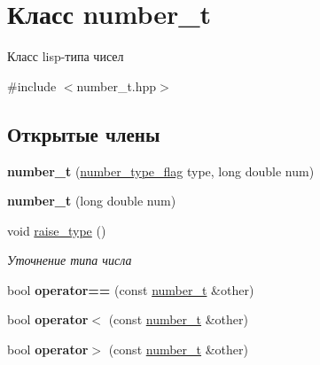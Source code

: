 \hypertarget{classnumber__t}{}\section{Класс number\+\_\+t}
\label{classnumber__t}


Класс lisp-\/типа чисел  




{\ttfamily \#include $<$number\+\_\+t.\+hpp$>$}

\subsection*{Открытые члены}
\begin{DoxyCompactItemize}
\item 
\mbox{\label{classnumber__t_a62c293bbf71ab10867cc6eb4f9cfced4}} 
{\bfseries number\+\_\+t} (\mbox{\hyperlink{number__t_8hpp_a9c37ed0386636f462116b6e8d1fd8312}{number\+\_\+type\+\_\+flag}} type, long double num)
\item 
\mbox{\label{classnumber__t_a7937289aec5501024cf903613f04192b}} 
{\bfseries number\+\_\+t} (long double num)
\item 
\mbox{\label{classnumber__t_aac9b03b1c5596ed3f95d4a4ba878b110}} 
void \mbox{\hyperlink{classnumber__t_aac9b03b1c5596ed3f95d4a4ba878b110}{raise\+\_\+type}} ()
\begin{DoxyCompactList}\small\item\em Уточнение типа числа \end{DoxyCompactList}\item 
\mbox{\label{classnumber__t_ad6f4eea4d15cd960db85d864895d4099}} 
bool {\bfseries operator==} (const \mbox{\hyperlink{classnumber__t}{number\+\_\+t}} \&other)
\item 
\mbox{\label{classnumber__t_a57715f62c21357737396f71b9a45aa99}} 
bool {\bfseries operator$<$} (const \mbox{\hyperlink{classnumber__t}{number\+\_\+t}} \&other)
\item 
\mbox{\label{classnumber__t_a30028f85921ce59a6163378f4ca52182}} 
bool {\bfseries operator$>$} (const \mbox{\hyperlink{classnumber__t}{number\+\_\+t}} \&other)
\item 

\end{DoxyCompactItemize}
